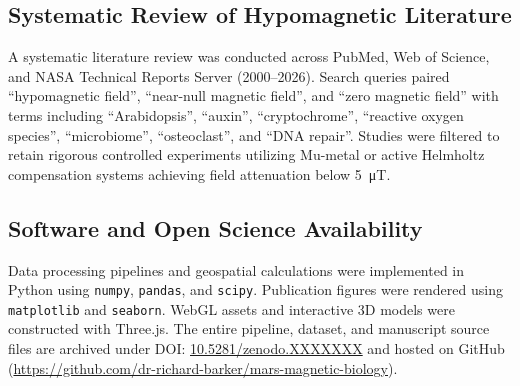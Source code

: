 \subsection{Systematic Review of Hypomagnetic Literature}
A systematic literature review was conducted across PubMed, Web of Science, and NASA Technical Reports Server (2000--2026). Search queries paired ``hypomagnetic field'', ``near-null magnetic field'', and ``zero magnetic field'' with terms including ``Arabidopsis'', ``auxin'', ``cryptochrome'', ``reactive oxygen species'', ``microbiome'', ``osteoclast'', and ``DNA repair''. Studies were filtered to retain rigorous controlled experiments utilizing Mu-metal or active Helmholtz compensation systems achieving field attenuation below \SI{5}{\micro\tesla}.

\subsection{Software and Open Science Availability}
Data processing pipelines and geospatial calculations were implemented in Python using \texttt{numpy}, \texttt{pandas}, and \texttt{scipy}. Publication figures were rendered using \texttt{matplotlib} and \texttt{seaborn}. WebGL assets and interactive 3D models were constructed with Three.js. The entire pipeline, dataset, and manuscript source files are archived under DOI: \href{https://doi.org/10.5281/zenodo.XXXXXXX}{10.5281/zenodo.XXXXXXX} and hosted on GitHub (\url{https://github.com/dr-richard-barker/mars-magnetic-biology}).
